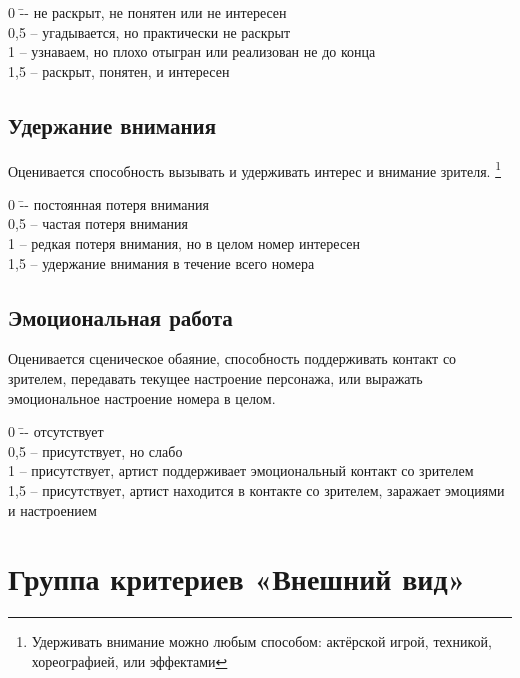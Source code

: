 \documentclass[12pt]{article}
\begin{document}
\begin{tabbing}
0\hspace{0.8em}  \= -- не раскрыт, не понятен или не интересен \\
0,5 \>-- угадывается, но практически не раскрыт\\
1 \>-- узнаваем, но плохо отыгран или реализован не до конца\\
1,5 \>-- раскрыт, понятен, и интересен
\end{tabbing}


\subsection{Удержание внимания}
Оценивается способность вызывать и удерживать интерес и внимание зрителя.
\footnote{Удерживать внимание можно любым способом: актёрской игрой, техникой, хореографией, или эффектами}

\begin{tabbing}
0\hspace{0.8em}  \= -- постоянная потеря внимания\\
0,5 \>-- частая потеря внимания\\
1 \>-- редкая потеря внимания, но в целом номер интересен\\
1,5 \>-- удержание внимания в течение всего номера
\end{tabbing}


\subsection{Эмоциональная работа} 
Оценивается сценическое обаяние, способность поддерживать контакт со зрителем, передавать текущее настроение персонажа, или выражать эмоциональное настроение номера в целом.

\begin{tabbing}
0\hspace{0.8em}  \= -- отсутствует\\
0,5 \>-- присутствует, но слабо\\
1 \>-- присутствует, артист поддерживает эмоциональный контакт со зрителем\\ 
1,5 \>-- присутствует, артист находится в контакте со зрителем, заражает эмоциями и настроением
\end{tabbing}


\section{Группа критериев «Внешний вид»}
\end{document}
